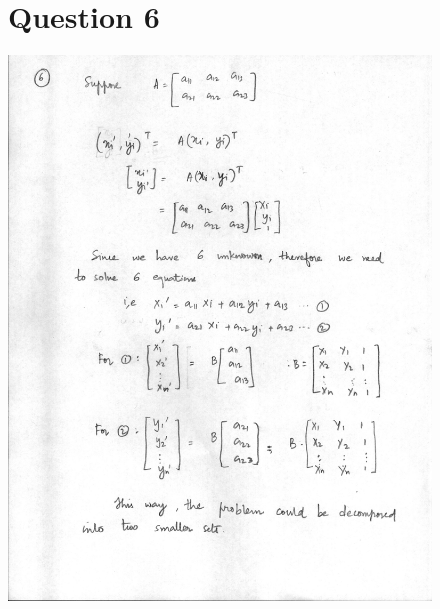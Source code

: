 \documentclass{article}
\begin{document}
\begin{figure}
\section*{Question 6}
\includegraphics[width=15cm]{3.jpg}
\end{figure}
\end{document}
